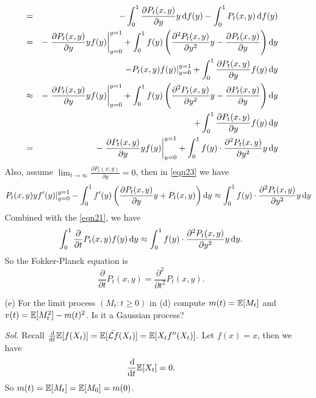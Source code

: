 \begin{enumerate}
\begin{eqnarray}
            & = & - \int_0^1 \frac{\partial P_t(x,y)}{\partial y} y \dif f(y) - \int_0^1 P_t(x,y) \dif f(y) \notag \\ 
            & = & - \left. \frac{\partial P_t(x,y)}{\partial y} y f(y) \right\vert_{y=0}^{y=1} + \int_0^1 f(y) \left( \frac{\partial^2 P_t(x,y)}{\partial y^2} y - \frac{\partial P_t(x,y)}{\partial y}\right) \dif y \notag \\ 
            & & - P_t(x,y)f(y) |_{y = 0}^{y = 1} + \int_0^1 \frac{\partial P_t(x,y)}{\partial y} f(y) \dif y \notag \\ 
            & \approx & - \left. \frac{\partial P_t(x,y)}{\partial y} y f(y) \right\vert_{y=0}^{y=1} + \int_0^1 f(y) \left( \frac{\partial^2 P_t(x,y)}{\partial y^2} y - \frac{\partial P_t(x,y)}{\partial y}\right) \dif y \notag \\ 
            & & + \int_0^1 \frac{\partial P_t(x,y)}{\partial y} f(y) \dif y \notag \\ 
            & = & - \left. \frac{\partial P_t(x,y)}{\partial y} y f(y) \right\vert_{y=0}^{y=1} + \int_0^1 f(y) \cdot \frac{\partial^2 P_t(x,y)}{\partial y^2} y \dif y
        \end{eqnarray}
        Also, assume $\lim_{t\to\infty} \frac{\partial P_t(x,y)}{\partial y} = 0$, then in \eqref{eqn23} we have 
        \begin{equation*}
            P_t(x,y) y f'(y) |_{y = 0}^{y = 1} - \int_0^1 f'(y)  \left( \frac{\partial P_t(x,y)}{\partial y} y + P_t(x,y) \right) \dif y \approx \int_0^1 f(y) \cdot \frac{\partial^2 P_t(x,y)}{\partial y^2} y \dif y
        \end{equation*}
        Combined with the \eqref{eqn21}, we have 
        \begin{equation*}
            \int_0^1 \frac{\partial}{\partial t} P_t(x, y) f(y) \dif y \approx \int_0^1 f(y) \cdot \frac{\partial^2 P_t(x,y)}{\partial y^2} y \dif y.
        \end{equation*}
        So the Fokker-Planck equation is 
        \begin{equation}\label{eqn24}
            \frac{\partial}{\partial t} P_t(x,y) = \frac{\partial^2}{\partial t^2} P_t(x,y).
        \end{equation}

        \item[(e)] For the limit process $(M_t: t \ge 0)$ in (d) compute $m(t) = \mathbb{E}[M_t]$ and $v(t) = \mathbb{E}[M_t^2] - m(t)^2$. Is it a Gaussian process?
        
        \textit{ Sol. } Recall $\frac{\dif}{\dif t}\mbb{E}[f(X_t)] = \mbb{E}[\bar{\mathcal{L}f}(X_t)] = \mbb{E} [X_t f''(X_t)]$. Let $f(x) = x$, then we have 
        \begin{equation*}
            \frac{\dif}{\dif t} \mbb{E} [X_t] = 0.
        \end{equation*}
        So $m(t) = \mathbb{E} [M_t] = \mathbb{E} [M_0] = m(0)$. 


\end{enumerate}
